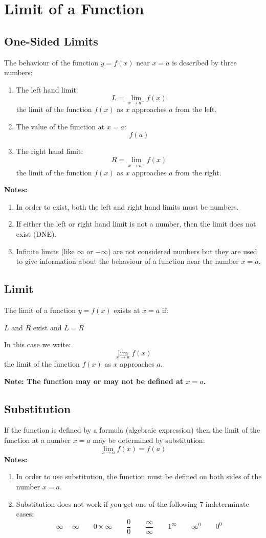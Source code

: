 \section{Limit of a Function}
\subsection{One-Sided Limits}
	The behaviour of the function $y=f(x)$ near $x=a$ is described by three numbers:
	\begin{enumerate}
		\item The left hand limit: \[L = \lim_{x \to a^-} f(x)\] the limit of the function $f(x)$ as $x$ approaches $a$ from the left.
		\item The value of the function at $x=a$: \[f(a)\]
		\item The right hand limit: \[R = \lim_{x \to a^+} f(x)\] the limit of the function $f(x)$ as $x$ approaches $a$ from the right.
	\end{enumerate}
	\textbf{Notes:}
	\begin{enumerate}
		\item In order to exist, both the left and right hand limits must be numbers.
		\item If either the left or right hand limit is not a number, then the limit does not exist (DNE).
		\item Infinite limits (like $\infty$ or $-\infty$) are not considered numbers but they are used to give information about the behaviour of a function near the number $x = a$.
	\end{enumerate}
\subsection{Limit}
	The limit of a function $y=f(x)$ exists at $x=a$ if:
	\begin{center}
		$L$ and $R$ exist and $L = R$
	\end{center}
	In this case we write:
	\[\lim_{x \to a} f(x)\]
	the limit of the function $f(x)$ as $x$ approaches $a$.

	\textbf{Note: The function may or may not be defined at $x = a$.}
\subsection{Substitution}
	If the function is defined by a formula (algebraic expression) then the limit of the function at a number $x = a$ may be determined by substitution:
	\[\lim_{x \to a} f(x) = f(a)\]
	\textbf{Notes:}
	\begin{enumerate}
		\item In order to use substitution, the function must be defined on both sides of the number $x=a$.
		\item Substitution does not work if you get one of the following 7 indeterminate cases:
		      \[\infty - \infty \qquad 0 \times \infty \qquad \frac{0}{0} \qquad \frac{\infty}{\infty} \qquad 1^{\infty} \qquad \infty^0 \qquad 0^0\]
	\end{enumerate}
